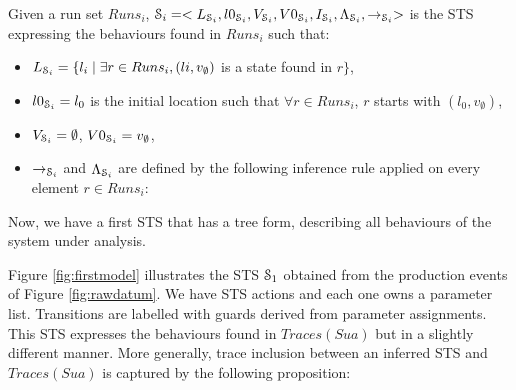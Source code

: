 \begin{definition}
	\label{IOSTS_tree}

    Given a run set $Runs_i$,
    $\EuScript{S}_i=<L_{\EuScript{S}_i},
    l0_{\EuScript{S}_i},V_{\EuScript{S}_i},\\
    V0_{\EuScript{S}_i}, I_{\EuScript{S}_i},
    \Lambda_{\EuScript{S}_i},\rightarrow_{\EuScript{S}_i}>$ is
    the STS expressing the behaviours found in $Runs_i$ such that:

	\begin{itemize}
        \item $L_{\EuScript{S}_i}= \{l_i \mid \exists r\in Runs_i, (li,v_\emptyset)$ is
		a state found in $r\}$,

        \item $l0_{\EuScript{S}_i} = l_0$ is the initial location such that $\forall r \in
        Runs_i$, $r$ starts with $(l_0,v_\emptyset)$,

		\item $V_{\EuScript{S}_i}=\emptyset$, $V0_{\EuScript{S}_i}=v_\emptyset$,

        \item $\rightarrow_{\EuScript{S}_i}$ and
        $\Lambda_{\EuScript{S}_i}$ are defined by the following
        inference rule applied on every element $r\in Runs_i$:
	\end{itemize}

	\noindent{}
\end{definition}

Now, we have a first STS that has a tree form, describing all
behaviours of the system under analysis.

Figure \ref{fig:firstmodel} illustrates the STS $\EuScript{S}_1$
obtained from the production events of Figure \ref{fig:rawdatum}.
We have STS actions and each one owns a parameter list.
Transitions are labelled with guards derived from parameter
assignments. This STS expresses the behaviours found in
$Traces(Sua)$ but in a slightly different manner. More generally,
trace inclusion between an inferred STS and $Traces(Sua)$ is
captured by the following proposition:

